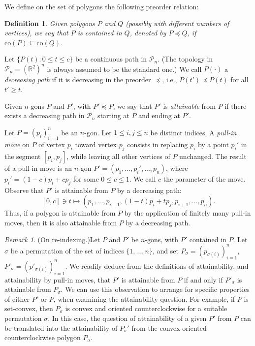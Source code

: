 \documentclass[11pt]{amsart}
\newtheorem{definition}[theorem]{Definition}
\theoremstyle{remark}
\newtheorem{remark}[theorem]{Remark}
\numberwithin{equation}{section}
\newcommand{\R}{\mathbb{R}}
\newcommand{\co}{\mathrm{co}}
\newcommand{\PP}{\mathcal{P}}
\renewcommand{\precsim}{\preccurlyeq}
\renewcommand{\leq}{\leqslant}
\renewcommand{\geq}{\geqslant}
\begin{document}
We define on the set of polygons the following preorder relation:

\begin{definition}
Given polygons $P$ and $Q$ (possibly with different numbers of vertices),
we say  that $P$ is contained in $Q$, denoted by $P\precsim Q$, if $\co(P)\subseteq \co(Q)$.
\end{definition}

Let $\{P(t):0\leq t\leq c\}$ be a continuous path in $\PP_n$. (The topology in $\PP_n=(\R^2)^n$ is always assumed to be the standard one.)
We call $P(\cdot)$ a \emph{decreasing path} if it is decreasing in the 
preorder $\precsim$, i.e., $P(t')\precsim P(t)$ for all $t'\geq t$. 

Given $n$-gons $P$ and $P'$, with $P'\precsim P$, we say that $P'$
is \emph{attainable} from $P$ if there exists a decreasing path in $\PP_n$ starting at $P$ and ending at $P'$.


Let $P=(p_i)_{i=1}^n$ be an $n$-gon. Let $1\leq i,j\leq n$ be distinct indices. A \emph{pull-in move} on $P$ of vertex $p_i$ toward vertex $p_j$ consists in replacing $p_i$ by a point $p_i'$ in the segment $[p_i,p_j]$, while leaving all other vertices of $P$ unchanged.  The result of a pull-in move is an $n$-gon $P'=(p_1,\ldots,p_i',\ldots,p_n)$, where  $p_i'=(1-c)p_i+cp_j$ for some  $0\leq c\leq 1$. We call $c$ the parameter of the move. Observe that $P'$ is attainable from $P$ by a decreasing path:
\[
[0,c]\ni t\mapsto (p_1,\ldots,p_{i-1},(1-t)p_i+tp_j,p_{i+1},\ldots,p_n).
\]
Thus, if a polygon is attainable from $P$ by the application of finitely many pull-in moves, then it is also attainable from $P$ by a decreasing path. 

\begin{remark}(On re-indexing.)\label{onreindexing} Let $P$ and $P'$ be $n$-gons, with $P'$ contained in $P$.
Let $\sigma$ be a permutation of the set of  indices $\{1,\ldots,n\}$, and set $P_{\sigma}=(p_{\sigma(i)})_{i=1}^n$, $P'_\sigma=(p'_{\sigma(i)})_{i=1}^n$.
We readily deduce from the definitions of attainability, and attainability by pull-in moves, that $P'$ is attainable from $P$ 
if and only if $P'_\sigma$ is attainable from $P_{\sigma}$. We can use this observation
to arrange for specific properties of either $P'$ or $P$, when examining the attainability question. For example, if $P$ is set-convex, then  $P_\sigma$
is convex and oriented counterclockwise for  a suitable permutation $\sigma$. In this case, the question of attainability of a given $P'$ from $P$ can be translated 
into the attainability of $P_\sigma'$ from the convex oriented counterclockwise polygon $P_\sigma$. 
\end{remark}
\end{document}
